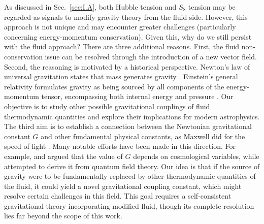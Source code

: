 \documentclass[aps,prd,twocolumn]{revtex4-2}
\begin{document}
As discussed in Sec.~\ref{sec:I.A}, both Hubble tension and $S_8$ tension may be regarded as signals to modify gravity theory from the fluid side. However, this approach is not unique and may encounter greater challenges (particularly concerning energy-momentum conservation). Given this, why do we still persist with the fluid approach? There are three additional reasons. First, the fluid non-conservation issue can be resolved through the introduction of a new vector field. Second, the reasoning is motivated by a historical perspective. Newton's law of universal gravitation states that mass generates gravity \cite{Newton1687.book}. Einstein's general relativity formulates gravity as being sourced by all components of the energy-momentum tensor, encompassing both internal energy and pressure \cite{Einstein1916.NotEngJ.354.769,Misner1973.book}. Our objective is to study other possible gravitational couplings of fluid thermodynamic quantities and explore their implications for modern astrophysics. The third aim is to establish a connection between the Newtonian gravitational constant $G$ and other fundamental physical constants, as Maxwell did for the speed of light \cite{Maxwell1861.PhilosMag.90.11,Maxwell1865.PhilosTransRSocLondon.155.459}. Many notable efforts have been made in this direction. For example, \citet{Dirac1937.Nature.139.323} and \citet{Dicke1959.Science.129.621} argued that the value of $G$ depends on cosmological variables, while \citet{Sakharov1967.NotEngJ.177.70} attempted to derive it from quantum field theory. Our idea is that if the source of gravity were to be fundamentally replaced by other thermodynamic quantities of the fluid, it could yield a novel gravitational coupling constant, which might resolve certain challenges in this field. This goal requires a self-consistent gravitational theory incorporating modified fluid, though its complete resolution lies far beyond the scope of this work.
\end{document}
